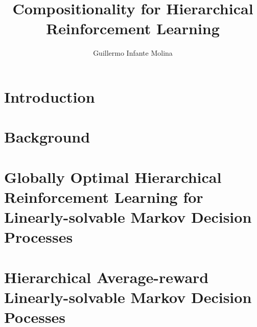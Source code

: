 \documentclass[12pt, a4paper,twoside]{tesi_upf}
\title{Compositionality for Hierarchical Reinforcement Learning}
\subtitle{}
\author{Guillermo Infante Molina}
\begin{document}
\frontmatter

\maketitle

\cleardoublepage




\cleardoublepage




\cleardoublepage




\cleardoublepage


\cleardoublepage


\tableofcontents

\listoffigures

\listoftables

\setlength{\parskip}{0.5\baselineskip}
\setlength{\parindent}{0pt}
\raggedbottom
\mainmatter

\chapter{Introduction}


\chapter{Background}


\chapter{Globally Optimal Hierarchical Reinforcement Learning for Linearly-solvable Markov Decision Processes}

\chapter{Hierarchical Average-reward Linearly-solvable Markov Decision Pocesses}

\end{document}
